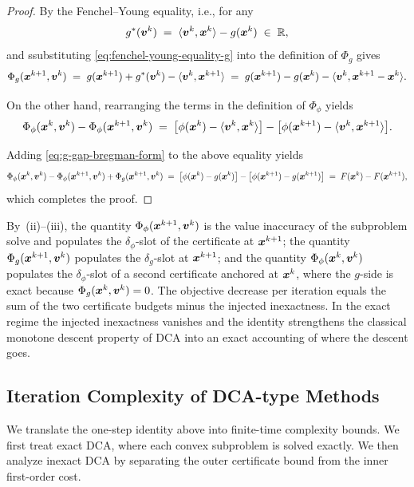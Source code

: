 \begin{proof}
By the Fenchel--Young equality, i.e.,  for any 
\begin{equation}
    g^*(\bm{v}^k)
    \;=\;
    \langle\bm{v}^k,\bm{x}^k\rangle-g(\bm{x}^k)
    \;\in\;\mathbb{R},
    \label{eq:fenchel-young-equality-g}
\end{equation} and 
ssubstituting \eqref{eq:fenchel-young-equality-g} into the definition of
$\Phi_g$ gives
\begin{equation}
    \Phi_g(\bm{x}^{k+1},\bm{v}^k)
    \;=\;
    g(\bm{x}^{k+1})+g^*(\bm{v}^k)-\langle\bm{v}^k,\bm{x}^{k+1}\rangle
    \;=\;
    g(\bm{x}^{k+1})-g(\bm{x}^k)-\langle\bm{v}^k,\bm{x}^{k+1}-\bm{x}^k\rangle.
    \label{eq:g-gap-bregman-form}
\end{equation}

On the other hand, rearranging the terms in the definition of
$\Phi_\phi$ yields
\[
    \Phi_\phi(\bm{x}^k,\bm{v}^k)-\Phi_\phi(\bm{x}^{k+1},\bm{v}^k)
    \;=\;
    \bigl[\phi(\bm{x}^k)-\langle\bm{v}^k,\bm{x}^k\rangle\bigr]
    -\bigl[\phi(\bm{x}^{k+1})-\langle\bm{v}^k,\bm{x}^{k+1}\rangle\bigr].
\]

Adding \eqref{eq:g-gap-bregman-form} to the above equality yields
\[
    \Phi_\phi(\bm{x}^k,\bm{v}^k)-\Phi_\phi(\bm{x}^{k+1},\bm{v}^k)
    +\Phi_g(\bm{x}^{k+1},\bm{v}^k)
    \;=\;
    \bigl[\phi(\bm{x}^k)-g(\bm{x}^k)\bigr]
    -\bigl[\phi(\bm{x}^{k+1})-g(\bm{x}^{k+1})\bigr]
    \;=\;
    F(\bm{x}^k)-F(\bm{x}^{k+1}),
\]
which completes the proof.
\end{proof}
By
\,(ii)--(iii), the quantity
$\Phi_\phi(\bm{x}^{k+1},\bm{v}^k)$ is the value inaccuracy of the subproblem
solve and populates the $\delta_\phi$-slot of the certificate at
$\bm{x}^{k+1}$; the quantity $\Phi_g(\bm{x}^{k+1},\bm{v}^k)$ populates the
$\delta_g$-slot at $\bm{x}^{k+1}$; and the quantity $\Phi_\phi(\bm{x}^k,\bm{v}^k)$
populates the $\delta_\phi$-slot of a second certificate anchored at
$\bm{x}^k$, where the $g$-side is exact because $\Phi_g(\bm{x}^k,\bm{v}^k)=0$. The
objective decrease per iteration equals the sum of the two certificate
budgets minus the injected inexactness. In the exact regime the injected
inexactness vanishes and the identity strengthens the classical monotone
descent property of DCA \citep{lethi2009dc,abbaszadehpeivasti2023rate}
into an exact accounting of where the descent goes.

\subsection{Iteration Complexity of DCA-type Methods}
We translate the one-step identity above into finite-time complexity
bounds. We first treat exact DCA, where each convex subproblem is solved
exactly. We then analyze inexact DCA by separating the outer certificate
bound from the inner first-order cost.

